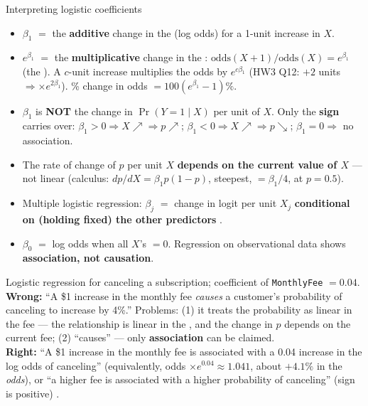 \begin{topic}{Interpreting logistic coefficients}
\begin{itemize}
\item $\beta_1$ $=$ the \textbf{additive} change in the  (log odds) for a 1-unit increase in $X$.
\item $e^{\beta_1}$ $=$ the \textbf{multiplicative} change in the :
  $\text{odds}(X{+}1)/\text{odds}(X)=e^{\beta_1}$ (the ). A $c$-unit increase multiplies the odds by
  $e^{c\beta_1}$ (HW3 Q12: $+2$ units $\Rightarrow\times e^{2\beta_1}$). \% change in odds $=100(e^{\beta_1}-1)\%$.
\item $\beta_1$ is \textbf{NOT} the change in $\Pr(Y=1\mid X)$ per unit of $X$. Only the \textbf{sign} carries over:
  $\beta_1>0\Rightarrow X\nearrow\Rightarrow p\nearrow$;\; $\beta_1<0\Rightarrow X\nearrow\Rightarrow p\searrow$;\;
  $\beta_1=0\Rightarrow$ no association.
\item The rate of change of $p$ per unit $X$ \textbf{depends on the current value of $X$} --- not linear
  (calculus: $dp/dX=\beta_1p(1-p)$, steepest, $=\beta_1/4$, at $p=0.5$).
\item Multiple logistic regression: $\beta_j$ $=$ change in logit per unit $X_j$
  \textbf{conditional on (holding fixed) the other predictors} .
\item $\beta_0$ $=$ log odds when all $X$'s $=0$. Regression on observational data shows
  \textbf{association, not causation}.
\end{itemize}
\end{topic}

\begin{trap}
Logistic regression for canceling a subscription; coefficient of \texttt{MonthlyFee} $=0.04$.\\
\textbf{Wrong:} ``A \$1 increase in the monthly fee \emph{causes} a customer's probability of canceling to
increase by 4\%.'' Problems: (1) it treats the probability as linear in the fee --- the relationship is
linear in the , and the change in $p$ depends on the current fee; (2) ``causes'' ---
only \textbf{association} can be claimed.\\
\textbf{Right:} ``A \$1 increase in the monthly fee is associated with a 0.04 increase in the log odds of
canceling'' (equivalently, odds $\times e^{0.04}\approx1.041$, about $+4.1\%$ in the \emph{odds}), or
``a higher fee is associated with a higher probability of canceling'' (sign is positive) .
\end{trap}

